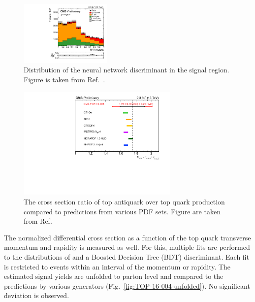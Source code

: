 \documentclass{PoS}
\begin{document}
\begin{figure}[htbp]
\begin{center}
\includegraphics[width=0.4\textwidth]{figures/tchannel/2j1t_BDT.pdf}
\caption{\label{fig:TOP-16-003-2j1t-NN}Distribution of the neural network discriminant in the signal region. Figure is taken from Ref.~\cite{CMS-PAS-TOP-16-003}.}
\end{center}
\end{figure}



\begin{figure}[htbp]
\begin{center}
\includegraphics[width=0.7\textwidth]{figures/tchannel/ratio.pdf}
\caption{\label{fig:TOP-16-003-2j1t-R}The cross section ratio of top antiquark over top quark production compared to predictions from various PDF sets. Figure are taken from Ref.~\cite{CMS-PAS-TOP-16-003}}
\end{center}
\end{figure}

The normalized differential cross section as a function of the top quark transverse momentum and rapidity is measured as well. For this, multiple fits are performed to the distributions of \mtw and a Boosted Decision Tree (BDT) discriminant. Each fit is restricted to events within an interval of the momentum or rapidity. The estimated signal yields are unfolded to parton level and compared to the predictions by various generators (Fig.~\ref{fig:TOP-16-004-unfolded}). No significant deviation is observed.
\end{document}
